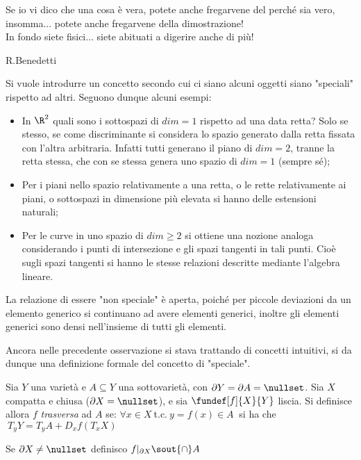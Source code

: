 
\begin{oss}

\end{oss}


\epigraph{Se io vi dico che una cosa è vera, potete anche fregarvene del perché sia vero, insomma... potete anche fregarvene della dimostrazione!\\ In fondo siete fisici... siete abituati a digerire anche di più!}{R.Benedetti}

Si vuole introdurre un concetto secondo cui ci siano alcuni oggetti siano "speciali" rispetto ad altri. Seguono dunque alcuni esempi:

\begin{es}
\begin{itemize}
\item In $\R^2$ quali sono i sottospazi di $dim = 1$ rispetto ad una data retta? Solo se stesso, se come discriminante si considera lo spazio generato dalla retta fissata con l'altra arbitraria. Infatti tutti generano il piano di $dim = 2$, tranne la retta stessa, che con se stessa genera uno spazio di $dim = 1$ (sempre sé);
\item Per i piani nello spazio relativamente a una retta, o le rette relativamente ai piani, o sottospazi in dimensione più elevata si hanno delle estensioni naturali;
\item Per le curve in uno spazio di $dim \geq 2$ si ottiene una nozione analoga considerando i punti di intersezione e gli spazi tangenti in tali punti. Cioè sugli spazi tangenti si hanno le stesse relazioni descritte mediante l'algebra lineare.
\end{itemize}
\end{es}

\begin{oss}
La relazione di essere "non speciale" è aperta, poiché per piccole deviazioni da un elemento generico si continuano ad avere elementi generici, inoltre gli elementi generici sono densi nell'insieme di tutti gli elementi.
\end{oss}

Ancora nelle precedente osservazione si stava trattando di concetti intuitivi, si da dunque una definizione formale del concetto di "speciale".

\begin{defn}[Trasversalità]
Sia $Y$ una varietà e $A\subseteq Y$ una sottovarietà, con $\partial Y = \partial A = \nullset$. Sia $X$ compatta e chiusa ($\partial X = \nullset$), e sia $\fundef[f]{X}{Y}$ liscia.
Si definisce allora $f$ \emph{trasversa} ad $A$ se: $\forall x \in X~$t.c.$~y = f(x) \in A~$ si ha che $~T_yY = T_yA + D_xf(T_xX)$
\end{defn}

\begin{es}
\end{es}

\begin{defn}
Se $\partial X \neq \nullset$ definisco $f|_{\partial X} \sout{\cap} A$
\end{defn}
